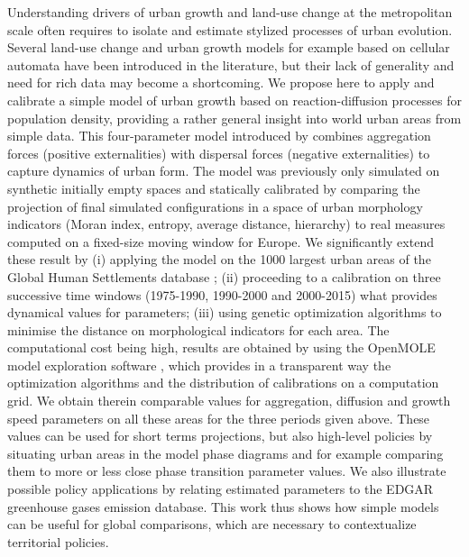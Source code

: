 \documentclass[11pt]{article}
\begin{document}
Understanding drivers of urban growth and land-use change at the metropolitan scale often requires to isolate and estimate stylized processes of urban evolution. Several land-use change and urban growth models for example based on cellular automata have been introduced in the literature, but their lack of generality and need for rich data may become a shortcoming. We propose here to apply and calibrate a simple model of urban growth based on reaction-diffusion processes for population density, providing a rather general insight into world urban areas from simple data. This four-parameter model introduced by \cite{raimbault2018calibration} combines aggregation forces (positive externalities) with dispersal forces (negative externalities) to capture dynamics of urban form. The model was previously only simulated on synthetic initially empty spaces and statically calibrated by comparing the projection of final simulated configurations in a space of urban morphology indicators (Moran index, entropy, average distance, hierarchy) to real measures computed on a fixed-size moving window for Europe. We significantly extend these result by (i) applying the model on the 1000 largest urban areas of the Global Human Settlements database \citep{Florczyk2019ghs}; (ii) proceeding to a calibration on three successive time windows (1975-1990, 1990-2000 and 2000-2015) what provides dynamical values for parameters; (iii) using genetic optimization algorithms to minimise the distance on morphological indicators for each area. The computational cost being high, results are obtained by using the OpenMOLE model exploration software \citep{reuillon2013openmole}, which provides in a transparent way the optimization algorithms and the distribution of calibrations on a computation grid. We obtain therein comparable values for aggregation, diffusion and growth speed parameters on all these areas for the three periods given above. These values can be used for short terms projections, but also high-level policies by situating urban areas in the model phase diagrams and for example comparing them to more or less close phase transition parameter values. We also illustrate possible policy applications by relating estimated parameters to the EDGAR greenhouse gases emission database. This work thus shows how simple models can be useful for global comparisons, which are necessary to contextualize territorial policies.






\footnotesize



\end{document}
